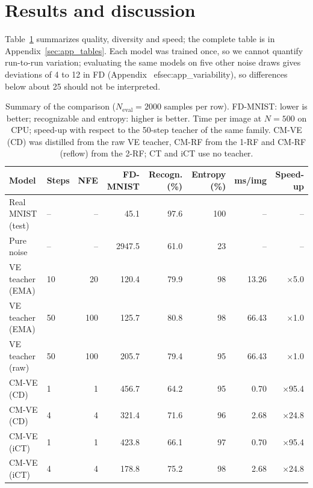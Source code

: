 \documentclass{article}
\begin{document}
\section{Results and discussion}
\label{sec:results}

Table~\ref{tab:summary} summarizes quality, diversity and speed; the complete
table is in Appendix~\ref{sec:app_tables}. Each model was trained once, so we
cannot quantify run-to-run variation; evaluating the same models on five other
noise draws gives deviations of 4 to 12 in FD (Appendix~
ef{sec:app_variability}),
so differences below about 25 should not be interpreted.

\begin{table}[!htbp]
  \caption{Summary of the comparison ($N_\text{eval} = 2000$ samples per row).
  FD-MNIST: lower is better; recognizable and entropy: higher is better.
  Time per image at $N = 500$ on CPU; speed-up with respect to the 50-step
  teacher of the same family. CM-VE (CD) was distilled from the raw VE
  teacher, CM-RF from the 1-RF and CM-RF (reflow) from the 2-RF; CT and iCT
  use no teacher.}
  \label{tab:summary}
  \centering
  \footnotesize
  \begin{tabular}{llrrrrrr}
    \toprule
    Model & Steps & NFE & FD-MNIST & Recogn. (\%) & Entropy (\%) & ms/img & Speed-up \\
    \midrule
    Real MNIST (test) & -- & -- & 45.1 & 97.6 & 100 & -- & -- \\
    Pure noise & -- & -- & 2947.5 & 61.0 & 23 & -- & -- \\
    \midrule
    VE teacher (EMA) & 10 & 20 & 120.4 & 79.9 & 98 & 13.26 & $\times$5.0 \\
    VE teacher (EMA) & 50 & 100 & 125.7 & 80.8 & 98 & 66.43 & $\times$1.0 \\
    VE teacher (raw) & 50 & 100 & 205.7 & 79.4 & 95 & 66.43 & $\times$1.0 \\
    \midrule
    CM-VE (CD) & 1 & 1 & 456.7 & 64.2 & 95 & 0.70 & $\times$95.4 \\
    CM-VE (CD) & 4 & 4 & 321.4 & 71.6 & 96 & 2.68 & $\times$24.8 \\
    \midrule
    CM-VE (iCT) & 1 & 1 & 423.8 & 66.1 & 97 & 0.70 & $\times$95.4 \\
    CM-VE (iCT) & 4 & 4 & 178.8 & 75.2 & 98 & 2.68 & $\times$24.8 \\
    \midrule

\end{tabular}
\end{table}
\end{document}
